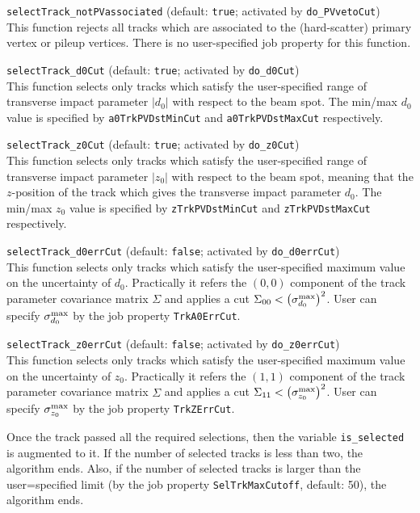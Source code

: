 \begin{description}
\item{{\tt selectTrack\_notPVassociated} (default: {\tt true}; activated by {\tt do\_PVvetoCut}})\\This function rejects all tracks which are associated to the (hard-scatter) primary vertex or pileup vertices. There is no user-specified job property for this function.
\item{{\tt selectTrack\_d0Cut} (default: {\tt true}; activated by {\tt do\_d0Cut})}\\This function selects only tracks which satisfy the user-specified range of transverse impact parameter $|d_{0}|$ with respect to the beam spot. The min/max $d_{0}$ value is specified by {\tt a0TrkPVDstMinCut} and {\tt a0TrkPVDstMaxCut} respectively.
\item{{\tt selectTrack\_z0Cut} (default: {\tt true}; activated by {\tt do\_z0Cut})}\\This function selects only tracks which satisfy the user-specified range of transverse impact parameter $|z_{0}|$ with respect to the beam spot, meaning that the $z$-position of the track which gives the transverse impact parameter $d_{0}$. The min/max $z_{0}$ value is specified by {\tt zTrkPVDstMinCut} and {\tt zTrkPVDstMaxCut} respectively.
\item{{\tt selectTrack\_d0errCut} (default: {\tt false}; activated by {\tt do\_d0errCut}})\\This function selects only tracks which satisfy the user-specified maximum value on the uncertainty of $d_{0}$. Practically it refers the $(0,0)$ component of the track parameter covariance matrix $\Sigma$ and applies a cut $\Sigma_{00} < \left(\sigma_{d_{0}}^{\rm max}\right)^{2}$. User can specify $\sigma_{d_{0}}^{\rm max}$ by the job property {\tt TrkA0ErrCut}.
\item{{\tt selectTrack\_z0errCut} (default: {\tt false}; activated by {\tt do\_z0errCut}})\\This function selects only tracks which satisfy the user-specified maximum value on the uncertainty of $z_{0}$. Practically it refers the $(1,1)$ component of the track parameter covariance matrix $\Sigma$ and applies a cut $\Sigma_{11} < \left(\sigma_{z_{0}}^{\rm max}\right)^{2}$. User can specify $\sigma_{z_{0}}^{\rm max}$ by the job property {\tt TrkZErrCut}.
\end{description}

Once the track passed all the required selections, then the variable {\tt is\_selected} is augmented to it. If the number of selected tracks is less than two, the algorithm ends. Also, if the number of selected tracks is larger than the user=specified limit (by the job property {\tt SelTrkMaxCutoff}, default: 50), the algorithm ends.


